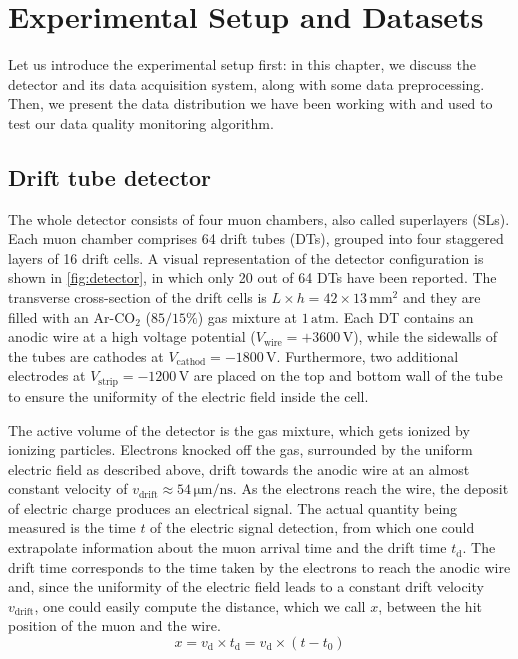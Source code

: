 \chapter{Experimental Setup and Datasets}
\label{chap:Experiment}

Let us introduce the experimental setup first: in this chapter, we discuss the detector and its data acquisition system,
along with some data preprocessing. Then, we present the data distribution we have been working with and used to
test our data quality monitoring algorithm.

\section{Drift tube detector}
\label{s:DriftTube}

The whole detector consists of four muon chambers, also called superlayers (SLs). Each muon chamber comprises 64
drift tubes (DTs), grouped into four staggered layers of 16 drift cells. A visual representation of the detector
configuration is shown in \autoref{fig:detector}, in which only 20 out of 64 DTs have been reported. The transverse
cross-section of the drift cells is $L \times h = 42 \times 13 \,\si{\mm}^2$ and they are filled with an
$\text{Ar-CO}_{2}$ ($85/15\%$) gas mixture at $1\,\text{atm}$. Each DT contains an anodic wire at a high voltage
potential ($V_{\text{wire}}=+3600\,\si{\volt}$), while the sidewalls of the tubes are cathodes at
$V_{\text{cathod}}=-1800\,\si{\volt}$. Furthermore, two additional electrodes at $V_{\text{strip}}=-1200\,\si{\volt}$
are placed on the top and bottom wall of the tube to ensure the uniformity of the electric field inside the cell. 

\begin{figure}[H]
    \centering
    
    \label{fig:detector}
\end{figure}  

The active volume of the detector is the gas mixture, which gets ionized by ionizing particles. Electrons
knocked off the gas, surrounded by the uniform electric field as described above, drift towards the anodic wire at an
almost constant velocity of $v_{\text{drift}} \approx 54 \,\si{\um}/\si{\ns}$. As the electrons reach the wire, the
deposit of electric charge produces an electrical signal. The actual quantity being measured is the time $t$ of the
electric signal detection, from which one could extrapolate information about the muon arrival time and the drift time
$t_{\text{d}}$. The drift time corresponds to the time taken by the electrons to reach the anodic wire and, since the
uniformity of the electric field leads to a constant drift velocity $v_{\text{drift}}$, one could easily compute the
distance, which we call $x$, between the hit position of the muon and the wire. 
\begin{equation}\label{eq:x}
    x = v_{\text{d}} \times t_{\text{d}} = v_{\text{d}} \times (t - t_{\text{0}})
\end{equation}

